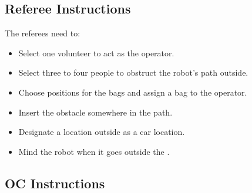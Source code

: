 \begin{enumerate}[nosep]
\end{enumerate}


\subsection*{Referee Instructions}

The referees need to:
\begin{itemize}[nosep]
	\item Select one volunteer to act as the operator.
    \item Select three to four people to obstruct the robot's path outside.
	\item Choose positions for the bags and assign a bag to the operator.
    \item Insert the obstacle somewhere in the path.
	\item Designate a location outside as a car location.
	\item Mind the robot when it goes outside the \Arena{}.
\end{itemize}

\subsection*{OC Instructions}

